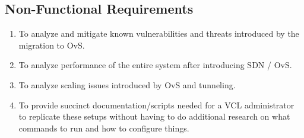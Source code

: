 \documentclass[12pt]{extarticle}
\begin{document}
\subsection{Non-Functional Requirements}
    \begin{enumerate}
        \item To analyze and mitigate known vulnerabilities and threats introduced by the migration to OvS.
        \item To analyze performance of the entire system after introducing SDN / OvS.
        \item To analyze scaling issues introduced by OvS and tunneling.
        \item To provide succinct documentation/scripts needed for a VCL administrator to replicate these setups without having to do additional research on what commands to run and how to configure things. 
    
    \end{enumerate}
    
\end{document}
